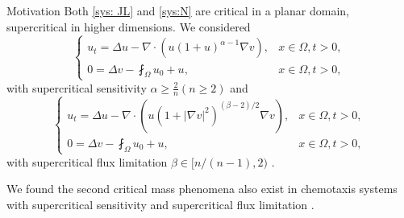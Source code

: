 \begin{frame}{Motivation}
Both \eqref{sys: JL} and \eqref{sys:N} are critical in a planar domain, supercritical in higher dimensions. We considered 
\begin{equation}\nonumber
	\left\{
	\begin{array}{ll}
		u_t = \Delta u - \nabla\cdot (u(1+u)^{\alpha - 1}\nabla v), & x\in\Omega, t > 0,\\
		0 = \Delta v - \fint_\Omega u_0 + u, & x\in\Omega, t > 0,
	\end{array}
	\right.
\end{equation}
with supercritical sensitivity $\alpha\geqslant\frac2n(n\geqslant2)$
and 
\begin{equation}\nonumber
	\begin{cases}
		u_t = \Delta u - \nabla\cdot (u(1+|\nabla v|^2)^{(\beta - 2)/2}\nabla v), & x\in\Omega, t > 0,\\
		0 = \Delta v - \fint_\Omega u_0 + u, & x\in\Omega, t > 0,
	\end{cases}
\end{equation}
with supercritical flux limitation \(\beta\in[n/(n-1),2)\) .
%

We found the second critical mass phenomena also exist in chemotaxis systems with supercritical sensitivity 
 and supercritical flux limitation .
\end{frame}

